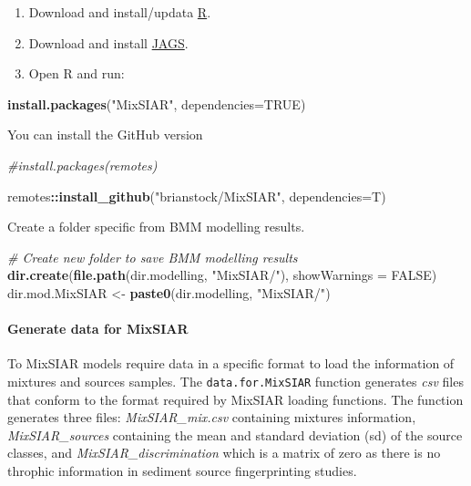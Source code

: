\documentclass[
]{article}
\newenvironment{Shaded}{\begin{snugshade}}{\end{snugshade}}
\newcommand{\AttributeTok}[1]{\textcolor[rgb]{0.13,0.29,0.53}{#1}}
\newcommand{\CommentTok}[1]{\textcolor[rgb]{0.56,0.35,0.01}{\textit{#1}}}
\newcommand{\ConstantTok}[1]{\textcolor[rgb]{0.56,0.35,0.01}{#1}}
\newcommand{\FunctionTok}[1]{\textcolor[rgb]{0.13,0.29,0.53}{\textbf{#1}}}
\newcommand{\NormalTok}[1]{#1}
\newcommand{\OtherTok}[1]{\textcolor[rgb]{0.56,0.35,0.01}{#1}}
\newcommand{\SpecialCharTok}[1]{\textcolor[rgb]{0.81,0.36,0.00}{\textbf{#1}}}
\newcommand{\StringTok}[1]{\textcolor[rgb]{0.31,0.60,0.02}{#1}}
\providecommand{\tightlist}{%
  \setlength{\itemsep}{0pt}\setlength{\parskip}{0pt}}
\begin{document}
\begin{enumerate}
\def\labelenumi{\arabic{enumi}.}
\tightlist
\item
  Download and install/updata \href{https://cran.r-project.org/}{R}.
\item
  Download and install \href{http://mcmc-jags.sourceforge.net/}{JAGS}.
\item
  Open R and run:
\end{enumerate}

\begin{Shaded}
\begin{Highlighting}[]
\FunctionTok{install.packages}\NormalTok{(}\StringTok{"MixSIAR"}\NormalTok{, }\AttributeTok{dependencies=}\ConstantTok{TRUE}\NormalTok{)}
\end{Highlighting}
\end{Shaded}

You can install the GitHub version

\begin{Shaded}
\begin{Highlighting}[]
\CommentTok{\#install.packages(remotes)}

\NormalTok{remotes}\SpecialCharTok{::}\FunctionTok{install\_github}\NormalTok{(}\StringTok{"brianstock/MixSIAR"}\NormalTok{, }\AttributeTok{dependencies=}\NormalTok{T)}
\end{Highlighting}
\end{Shaded}

Create a folder specific from BMM modelling results.

\begin{Shaded}
\begin{Highlighting}[]
\CommentTok{\# Create new folder to save BMM modelling results}
\FunctionTok{dir.create}\NormalTok{(}\FunctionTok{file.path}\NormalTok{(dir.modelling, }\StringTok{"MixSIAR/"}\NormalTok{), }\AttributeTok{showWarnings =} \ConstantTok{FALSE}\NormalTok{)}
\NormalTok{dir.mod.MixSIAR }\OtherTok{\textless{}{-}} \FunctionTok{paste0}\NormalTok{(dir.modelling, }\StringTok{"MixSIAR/"}\NormalTok{)}
\end{Highlighting}
\end{Shaded}

\hypertarget{generate-data-for-mixsiar}{%
\paragraph{Generate data for MixSIAR}\label{generate-data-for-mixsiar}}

To MixSIAR models require data in a specific format to load the
information of mixtures and sources samples. The
\texttt{data.for.MixSIAR} function generates \emph{csv} files that
conform to the format required by MixSIAR loading functions. The
function generates three files: \emph{MixSIAR\_mix.csv} containing
mixtures information, \emph{MixSIAR\_sources} containing the mean and
standard deviation (sd) of the source classes, and
\emph{MixSIAR\_discrimination} which is a matrix of zero as there is no
throphic information in sediment source fingerprinting studies.
\end{document}

